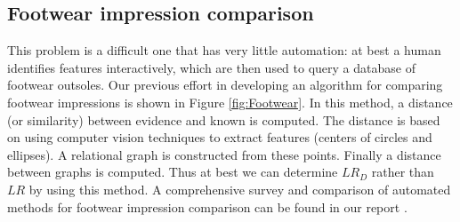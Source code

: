 \documentclass[11pt, doublespacing]{article}
\begin{document}
\subsection{Footwear impression comparison}
This problem is a difficult one that has very little automation: at best a human identifies features interactively, which are then used  to query a database of footwear outsoles. Our previous effort in developing an algorithm for comparing  footwear impressions  is shown in Figure \ref{fig:Footwear}. In this method,  a distance (or similarity) between evidence and known is computed. The distance is based on using computer vision techniques to extract features (centers of circles and ellipses).  A relational graph is constructed from these points. Finally a distance between graphs is computed.  Thus at best we can determine $LR_D$  rather than $LR$ by using this method.  A comprehensive survey and comparison of automated methods for footwear impression comparison can be found in our report \cite{Srihari2011a,Srihari2014}.
\end{document}
